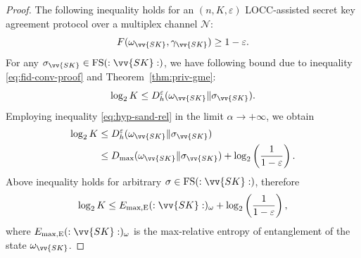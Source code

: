 \documentclass[aps,pra,twocolumn,superscriptaddress,longbibliography]{revtex4-1}
\def\FS{\operatorname{FS}}
\def\E{\operatorname{E}}
\newcommand{\mc}[1]{\mathcal{#1}}
\begin{document}
\begin{proof}
The following inequality holds for an $(n,K,\varepsilon)$ LOCC-assisted secret key agreement protocol over a multiplex channel $\mc{N}$:
\begin{equation}\label{eq:fid-conv-proof}
F(\omega_{\vv{SK}},\gamma_{\vv{SK}})\geq 1-\varepsilon. 
\end{equation}
For any $\sigma_{\vv{SK}}\in\FS(:\vv{SK}:)$, we have following bound due to inequality \eqref{eq:fid-conv-proof} and Theorem~\ref{thm:priv-gme}:
\begin{equation}
\log_2 K\leq D^\varepsilon_h(\omega_{\vv{SK}}\Vert\sigma_{\vv{SK}}). 
\end{equation}
Employing inequality \eqref{eq:hyp-sand-rel} in the limit $\alpha\to+\infty$, we obtain
\begin{align}
\log_2 K &\leq D^\varepsilon_h(\omega_{\vv{SK}}\Vert\sigma_{\vv{SK}}) \\
&\leq D_{\max}(\omega_{\vv{SK}}\Vert\sigma_{\vv{SK}})+\log_2\left(\frac{1}{1-\varepsilon}\right).
\end{align}
Above inequality holds for arbitrary $\sigma\in\FS(:\vv{SK}:)$, therefore
\begin{equation}\label{eq:con-max-proof}
\log_2 K \leq E_{\max,\E}(:\vv{SK}:)_{\omega}+\log_2\left(\frac{1}{1-\varepsilon}\right),
\end{equation}
where $E_{\max,\E}(:\vv{SK}:)_{\omega}$ is the max-relative entropy of entanglement of the state $\omega_{\vv{SK}}$.


\end{proof}
\end{document}
